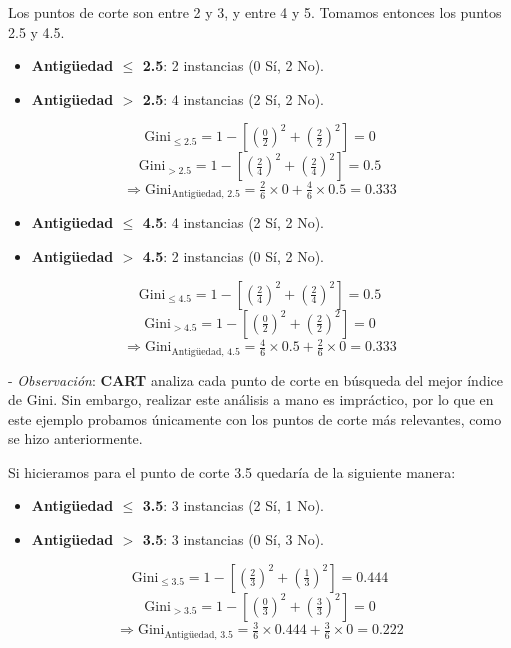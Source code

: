 \documentclass[12pt]{article}
\begin{document}
Los puntos de corte son entre 2 y 3, y entre 4 y 5. Tomamos entonces los puntos 2.5 y 4.5.

\begin{itemize}
  \item \textbf{Antigüedad $\leq$ 2.5}: 2 instancias (0 Sí, 2 No).
  \item \textbf{Antigüedad $>$ 2.5}: 4 instancias (2 Sí, 2 No).
\end{itemize}

\[
  \mathrm{Gini}_{\le2.5} = 1 - \left[\left(\tfrac{0}{2}\right)^2 + \left(\tfrac{2}{2}\right)^2\right] = 0
\]
\[
  \mathrm{Gini}_{>2.5} = 1 - \left[\left(\tfrac{2}{4}\right)^2 + \left(\tfrac{2}{4}\right)^2\right] = 0.5
\]
\[
  \Rightarrow \mathrm{Gini}_{\text{Antigüedad, 2.5}} = \tfrac{2}{6}\times0 + \tfrac{4}{6}\times0.5 = 0.333
\]

\begin{itemize}
  \item \textbf{Antigüedad $\leq$ 4.5}: 4 instancias (2 Sí, 2 No).
  \item \textbf{Antigüedad $>$ 4.5}: 2 instancias (0 Sí, 2 No).
\end{itemize}

\[
  \mathrm{Gini}_{\le4.5} = 1 - \left[\left(\tfrac{2}{4}\right)^2 + \left(\tfrac{2}{4}\right)^2\right] = 0.5
\]
\[
  \mathrm{Gini}_{>4.5} = 1 - \left[\left(\tfrac{0}{2}\right)^2 + \left(\tfrac{2}{2}\right)^2\right] = 0
\]
\[
  \Rightarrow \mathrm{Gini}_{\text{Antigüedad, 4.5}} = \tfrac{4}{6}\times0.5 + \tfrac{2}{6}\times0 = 0.333
\]

\vspace{1em}
- \textit{Observación}: \textbf{CART} analiza cada punto de corte en búsqueda del mejor índice de Gini. Sin embargo, realizar este análisis a mano es impráctico, por lo que en este ejemplo probamos únicamente con los puntos de corte más relevantes, como se hizo anteriormente.

\vspace{1em}

Si hicieramos para el punto de corte 3.5 quedaría de la siguiente manera:
\begin{itemize}
  \item \textbf{Antigüedad $\leq$ 3.5}: 3 instancias (2 Sí, 1 No).
  \item \textbf{Antigüedad $>$ 3.5}: 3 instancias (0 Sí, 3 No).
\end{itemize}
\[
  \mathrm{Gini}_{\le3.5} = 1 - \left[\left(\tfrac{2}{3}\right)^2 + \left(\tfrac{1}{3}\right)^2\right] = 0.444
\]
\[
  \mathrm{Gini}_{>3.5} = 1 - \left[\left(\tfrac{0}{3}\right)^2 + \left(\tfrac{3}{3}\right)^2\right] = 0
\]
\[
  \Rightarrow \mathrm{Gini}_{\text{Antigüedad, 3.5}} = \tfrac{3}{6}\times0.444 + \tfrac{3}{6}\times0 = 0.222
\]
\end{document}
